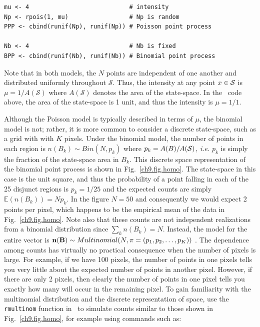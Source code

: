 \begin{center} %
\begin{verbatim}
mu <- 4                            # intensity
Np <- rpois(1, mu)                 # Np is random
PPP <- cbind(runif(Np), runif(Np)) # Poisson point process

Nb <- 4                            # Nb is fixed
BPP <- cbind(runif(Nb), runif(Nb)) # Binomial point process
\end{verbatim}
\end{center}

Note that in both models, the $N$ points are independent
of one another and distributed uniformly
throughout $\mathcal{S}$. Thus, the intensity at any point $x \in
\cal{S}$ is $\mu = 1 / A(\mathcal{S})$ where $A(\mathcal{S})$ denotes
the area of the state-space. In the \R~code above, the area of the
state-space is 1 unit, and thus the intensity is $\mu = 1/1$.

Although the Poisson model is typically described in terms of $\mu$,
the binomial model is not; rather, it
is more common to consider a discrete state-space, such as a grid with
with $K$ pixels. Under the binomial model, the number of points in
each region is $n(B_k) \sim Bin(N, p_k)$
where $p_k = A(B)/A(\cal{S})$, \emph{i.e.} $p_k$ is simply the fraction of
the state-space area in $B_k$. This discrete space representation of
the binomial point process is shown in Fig.~\ref{ch9.fig.homo}. The
state-space in this case is the unit square, and thus the probability of a
point falling in each of the 25 disjunct regions is $p_k = 1/25$ and
the expected counts are simply $\mathbb{E}(n(B_k)) = Np_k$. In
the figure $N=50$ and consequently we would expect 2 points per pixel, which
happens to be the empirical mean of the data in
Fig.~\ref{ch9.fig.homo}. Note also that these counts are not
independent realizations from a binomial distribution since $\sum_k
n(B_k) = N$. Instead, the model for the entire vector
is ${\bf n(B)} \sim Multinomial(N, {\mathbf{\pi}} = (p_1, p_2, \dots,
p_K))$ \citep{illian_etal:2008}. The dependence among counts has virtually
no practical consequence when the number of pixels is large. For
example, if we have 100 pixels, the number of points in one pixels
tells you very little about the expected number of points in another
pixel. However, if there are only 2 pixels, then clearly the number of
points in one pixel tells you exactly how many will occur in the
remaining pixel. To gain familiarity with the multinomial distribution
and the discrete representation of space, use the \verb+rmultinom+
function in \R~to simulate counts similar to those shown in
Fig.~\ref{ch9.fig.homo}, for example using commands
such as:

